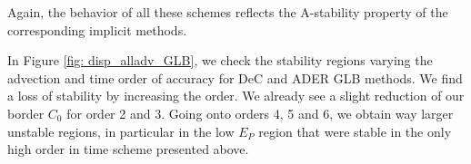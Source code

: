 Again, the behavior of all these schemes reflects the A-stability property of the corresponding implicit methods.






In Figure \ref{fig: disp_alladv_GLB}, we check the stability regions varying the advection and time order of accuracy for DeC and ADER GLB methods. 
We find a loss of stability by increasing the order. We already see a slight reduction of our border $C_0$ for order 2 and 3. Going onto orders 4, 5 and 6, we obtain way larger unstable regions, in particular in the low $E_P$ region that were stable in the only high order in time scheme presented above.

